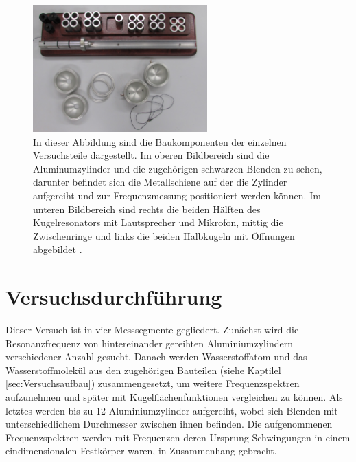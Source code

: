 \begin{figure}
    \centering
    \includegraphics[width=0.6\textwidth]{figure/Aufbau.pdf}
    \caption{In dieser Abbildung sind die Baukomponenten der einzelnen Versuchsteile 
    dargestellt. Im oberen Bildbereich sind die Aluminumzylinder und die 
    zugehörigen schwarzen Blenden zu sehen, darunter befindet sich die 
    Metallschiene auf der die Zylinder aufgereiht und zur Frequenzmessung 
    positioniert werden können. Im unteren Bildbereich sind rechts die beiden 
    Hälften des Kugelresonators mit Lautsprecher und Mikrofon, mittig die 
    Zwischenringe und links die beiden Halbkugeln mit Öffnungen abgebildet 
    \cite{sample}.}
\end{figure}
\newpage

\section{Versuchsdurchführung}
\label{sec:Versuchsdurchführung}

Dieser Versuch ist in vier Messsegmente gegliedert.
Zunächst wird die Resonanzfrequenz von hintereinander gereihten Aluminiumzylindern 
verschiedener Anzahl 
gesucht. Danach werden Wasserstoffatom und das Wasserstoffmolekül aus den zugehörigen 
Bauteilen (siehe Kaptilel \ref{sec:Versuchsaufbau}) zusammengesetzt, um weitere
Frequenzspektren aufzunehmen und später mit Kugelflächenfunktionen vergleichen zu können.
Als letztes werden bis zu 12 Aluminiumzylinder aufgereiht, wobei sich  
Blenden mit unterschiedlichem Durchmesser zwischen ihnen befinden. Die aufgenommenen 
Frequenzspektren werden mit Frequenzen deren Ursprung Schwingungen in einem 
eindimensionalen Festkörper waren, in Zusammenhang gebracht.

